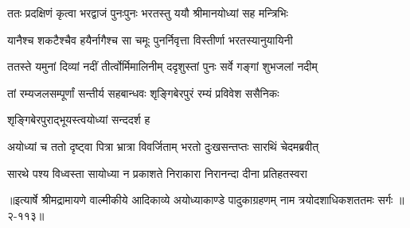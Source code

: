 \twolineshloka
{ततः प्रदक्षिणं कृत्वा भरद्वाजं पुनःपुनः}
{भरतस्तु ययौ श्रीमानयोध्यां सह मन्त्रिभिः} %

\twolineshloka
{यानैश्च शकटैश्चैव हयैर्नागैश्च सा चमूः}
{पुनर्निवृत्ता विस्तीर्णा भरतस्यानुयायिनी} %

\twolineshloka
{ततस्ते यमुनां दिव्यां नदीं तीर्त्वोर्मिमालिनीम्}
{ददृशुस्तां पुनः सर्वे गङ्गां शुभजलां नदीम्} %

\twolineshloka
{तां रम्यजलसम्पूर्णां सन्तीर्य सहबान्धवः}
{शृङ्गिबेरपुरं रम्यं प्रविवेश ससैनिकः} %

\onelineshloka
{शृङ्गिबेरपुराद्भूयस्त्वयोध्यां सन्ददर्श ह} %

\twolineshloka
{अयोध्यां च ततो दृष्ट्वा पित्रा भ्रात्रा विवर्जिताम्}
{भरतो दुःखसन्तप्तः सारथिं चेदमब्रवीत्} %

\twolineshloka
{सारथे पश्य विध्वस्ता सायोध्या न प्रकाशते}
{निराकारा निरानन्दा दीना प्रतिहतस्वरा} %


॥इत्यार्षे श्रीमद्रामायणे वाल्मीकीये आदिकाव्ये अयोध्याकाण्डे पादुकाग्रहणम् नाम त्रयोदशाधिकशततमः सर्गः ॥२-११३॥
